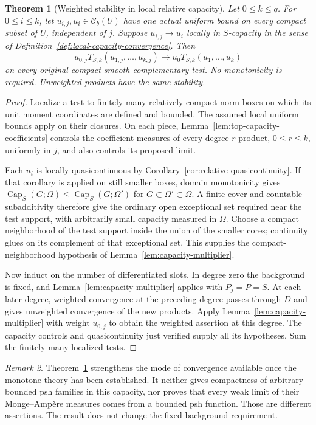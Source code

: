 \documentclass[11pt,a4paper]{article}
\numberwithin{equation}{section}
\newtheorem{theorem}{Theorem}[section]
\theoremstyle{definition}
\theoremstyle{remark}
\newtheorem{remark}[theorem]{Remark}
\newcommand{\Cb}{\mathcal C_b}
\begin{document}
\begin{theorem}[Weighted stability in local relative capacity]
\label{thm:capacity-stability}
Let $0\leq k\leq q$. For $0\leq i\leq k$, let
$u_{i,j},u_i\in\Cb(U)$ have one actual uniform bound on every
compact subset of $U$, independent of $j$. Suppose
$u_{i,j}\to u_i$ locally in $S$-capacity in the sense of
Definition~\ref{def:local-capacity-convergence}. Then
\[
 u_{0,j}T_{S,k}(u_{1,j},\ldots,u_{k,j})
       \longrightarrow u_0T_{S,k}(u_1,\ldots,u_k)
\]
on every original compact smooth complementary test. No monotonicity
is required. Unweighted products have the same stability.
\end{theorem}

\begin{proof}
Localize a test to finitely many relatively compact norm boxes on
which its unit moment coordinates are defined and bounded. The assumed
local uniform bounds apply on their closures. On each piece,
Lemma~\ref{lem:top-capacity-coefficients} controls the coefficient
measures of every degree-$r$ product, $0\leq r\leq k$, uniformly
in $j$, and also controls its proposed limit.

Each $u_i$ is locally quasicontinuous by
Corollary~\ref{cor:relative-quasicontinuity}. If that corollary is
applied on still smaller boxes, domain monotonicity gives
$\operatorname{Cap}_S(G;\Omega)\leq
\operatorname{Cap}_S(G;\Omega')$ for $G\subset\Omega'\subset\Omega$.
A finite cover and countable subadditivity therefore give the ordinary
open exceptional set required near the test support, with arbitrarily
small capacity measured in $\Omega$. Choose a compact neighborhood of
the test support inside the union of the smaller cores; continuity
glues on its complement of that exceptional set. This supplies the
compact-neighborhood hypothesis of Lemma~\ref{lem:capacity-multiplier}.

Now induct on the number of differentiated slots. In degree zero the
background is fixed, and Lemma~\ref{lem:capacity-multiplier} applies
with $P_j=P=S$. At each later degree, weighted convergence at the
preceding degree passes through $D$ and gives unweighted convergence
of the new products. Apply Lemma~\ref{lem:capacity-multiplier} with
weight $u_{0,j}$ to obtain the weighted assertion at this degree.
The capacity controls and quasicontinuity just verified supply all its
hypotheses. Sum the finitely many localized tests.
\end{proof}

\begin{remark}
Theorem~\ref{thm:capacity-stability} strengthens the mode of convergence
available once the monotone theory has been established. It neither
gives compactness of arbitrary bounded psh families in this capacity,
nor proves that every weak limit of their Monge--Amp\`ere measures
comes from a bounded psh function. Those are different assertions.
The result does not change the fixed-background requirement.
\end{remark}
\end{document}
